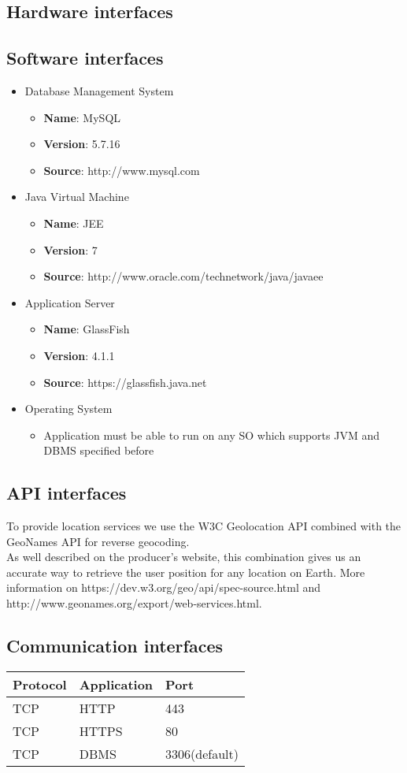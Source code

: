\subsection{Hardware interfaces}
\blindtext
\subsection{Software interfaces}
\begin{itemize}
	\item{Database Management System
		\begin{itemize}
			\item{{\bf Name}: MySQL}
			\item{{\bf Version}: 5.7.16}
			\item{{\bf Source}: http://www.mysql.com}
		\end{itemize}
	}
	\item{Java Virtual Machine
		\begin{itemize}
			\item{{\bf Name}: JEE}
			\item{{\bf Version}: 7}
			\item{{\bf Source}: http://www.oracle.com/technetwork/java/javaee}
		\end{itemize}
	}
	\item{Application Server
		\begin{itemize}
			\item{{\bf Name}: GlassFish}
			\item{{\bf Version}: 4.1.1}
			\item{{\bf Source}: https://glassfish.java.net}
		\end{itemize}
	}
	\item{Operating System
		\begin{itemize}
			\item{Application must be able to run on any SO which supports JVM and
				  DBMS specified before}
		\end{itemize}
	}

\end{itemize}

\subsection{API interfaces}
To provide location services we use the W3C Geolocation API combined with the GeoNames API for reverse geocoding. 
\\As well described on the producer's website, this combination gives us an accurate way to retrieve the user position for any location on Earth. More information on https://dev.w3.org/geo/api/spec-source.html and http://www.geonames.org/export/web-services.html.

\subsection{Communication interfaces}
\begin{center}
	\begin{tabular}{|l|l|l|}
	    \hline
	    Protocol & Application & Port \\\hline
	    \hline
	    TCP & HTTP & 443 \\\hline
	    TCP & HTTPS & 80 \\\hline
	    TCP & DBMS & 3306(default) \\\hline
	\end{tabular}
\end{center}